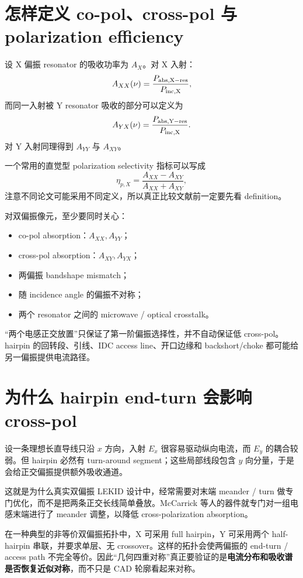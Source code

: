 \documentclass[11pt,a4paper,openany]{ctexrep}
\begin{document}
\section{怎样定义 co-pol、cross-pol 与 polarization efficiency}

设 X 偏振 resonator 的吸收功率为 $A_X$。对 X 入射：
\[
A_{XX}(\nu)=\frac{P_{\rm abs,X-res}}{P_{\rm inc,X}},
\]
而同一入射被 Y resonator 吸收的部分可以定义为
\[
A_{YX}(\nu)=\frac{P_{\rm abs,Y-res}}{P_{\rm inc,X}}.
\]
对 Y 入射同理得到 $A_{YY}$ 与 $A_{XY}$。

一个常用的直觉型 polarization selectivity 指标可以写成
\[
\eta_{p,X}=\frac{A_{XX}-A_{XY}}{A_{XX}+A_{XY}},
\]
注意不同论文可能采用不同定义，所以真正比较文献前一定要先看 definition。

对双偏振像元，至少要同时关心：
\begin{itemize}
  \item co-pol absorption：$A_{XX},A_{YY}$；
  \item cross-pol absorption：$A_{XY},A_{YX}$；
  \item 两偏振 bandshape mismatch；
  \item 随 incidence angle 的偏振不对称；
  \item 两个 resonator 之间的 microwave / optical crosstalk。
\end{itemize}

\begin{mistakebox}
“两个电感正交放置”只保证了第一阶偏振选择性，并不自动保证低 cross-pol。hairpin 的回转段、引线、IDC access line、开口边缘和 backshort/choke 都可能给另一偏振提供电流路径。
\end{mistakebox}

\section{为什么 hairpin end-turn 会影响 cross-pol}

设一条理想长直导线只沿 $x$ 方向，入射 $E_x$ 很容易驱动纵向电流，而 $E_y$ 的耦合较弱。但 hairpin 必然有 turn-around segment；这些局部线段包含 $y$ 向分量，于是会给正交偏振提供额外吸收通道。

这就是为什么真实双偏振 LEKID 设计中，经常需要对末端 meander / turn 做专门优化，而不是把两条正交长线简单叠放。McCarrick 等人的器件就专门对一组电感末端进行了 meander 调整，以降低 cross-polarization absorption。

\begin{projectbox}
在一种典型的非等价双偏振拓扑中，X 可采用 full hairpin，Y 可采用两个 half-hairpin 串联，并要求单层、无 crossover。这样的拓扑会使两偏振的 end-turn / access path 不完全等价。因此“几何四重对称”真正要验证的是\textbf{电流分布和吸收谱是否恢复近似对称}，而不只是 CAD 轮廓看起来对称。
\end{projectbox}
\end{document}
